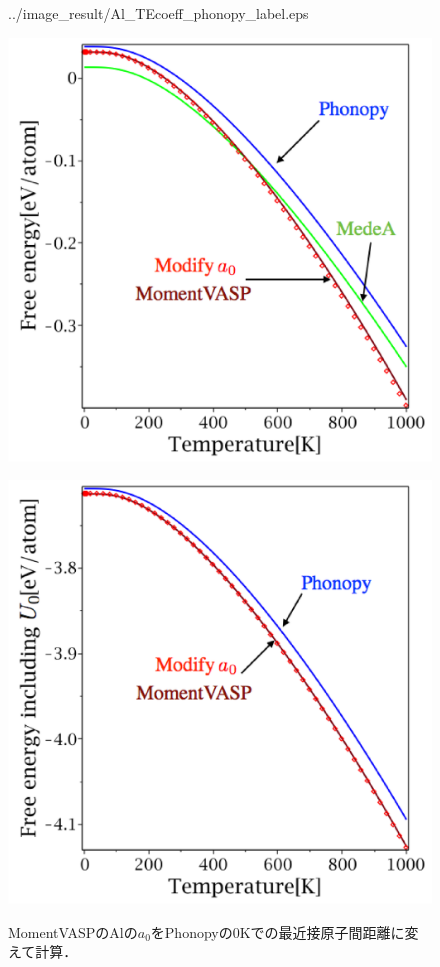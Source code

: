 \begin{figure}[htbp]
\begin{minipage}[b]{0.5\linewidth}
  {../image_result/Al_TEcoeff_phonopy_label.eps}
  \label{a0test2}
 \end{minipage}
 \hspace{10cm}
 \begin{minipage}[b]{0.5\linewidth}
  \centering
  \includegraphics[keepaspectratio, scale=0.42]
  {../image_result/Al_free_phonopy_label.eps}
  \label{a0test3}
 \end{minipage}
 \begin{minipage}[b]{0.5\linewidth}
  \centering
  \includegraphics[keepaspectratio, scale=0.42]
  {../image_result/Al_free_u0_phonopy_label.eps}
  \label{$U_0$を含んだ自由エネルギーの温度依存性}
 \end{minipage}
 \caption{MomentVASPのAlの$a_0$をPhonopyの0Kでの最近接原子間距離に変えて計算．}\label{fig:a0test}
\end{figure}
